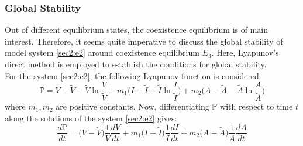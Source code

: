 \documentclass[12pt,a4wide]{report}
\numberwithin{equation}{chapter}
\numberwithin{theorem}{chapter}
\begin{document}
\subsubsection{Global Stability}
Out of different equilibrium states, the coexistence equilibrium is of main interest. Therefore, it seems quite imperative to discuss the global stability of model system \eqref{sec2:e2} around coexistence equilibrium $E_3$. Here, Lyapunov's direct method is employed to establish the conditions for global stability.\\
For the system \eqref{sec2:e2}, the following Lyapunov function is considered:
\begin{equation}\label{sec3:e36}
\mathbb P = V-\tilde V-\tilde V\ln\frac{V}{\tilde V}+m_1\bigg(I-\tilde I-\tilde I\ln\frac{I}{\tilde I}\bigg)+m_2\bigg(A-\tilde A-\tilde A\ln\frac{A}{\tilde A}\bigg)
\end{equation}
where $m_1,m_2$ are positive constants. Now, differentiating $\mathbb P$ with respect to time $t$ along the solutions of the system \eqref{sec2:e2} gives:
\begin{equation}\label{sec3:e37}
\frac{d\mathbb P}{dt}=\bigg(V-\tilde V\bigg)\frac{1}{V}\frac{dV}{dt} + m_1\bigg(I-\tilde I\bigg)\frac{1}{I}\frac{dI}{dt} + m_2 \bigg(A-\tilde A\bigg)\frac{1}{A}\frac{dA}{dt}
\end{equation}
\end{document}

